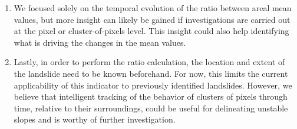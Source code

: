 \documentclass[nhess, manuscript]{copernicus}
\begin{document}
\begin{enumerate}
\item We focused solely on the temporal evolution of the ratio between areal mean values, but more insight can likely be gained if investigations are carried out at the pixel or cluster-of-pixels level. This insight could also help identifying what is driving the changes in the mean values. 
\item Lastly, in order to perform the ratio calculation, the location and extent of the landslide need to be known beforehand. For now, this limits the current applicability of this indicator to previously identified landslides. However, we believe that intelligent tracking of the behavior of clusters of pixels through time, relative to their surroundings, could be useful for delineating unstable slopes and is worthy of further investigation.
\end{enumerate}   





\end{document}
